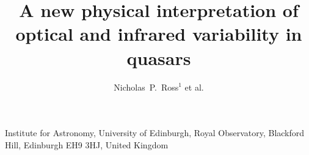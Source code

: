 \documentclass{nature}
\title{A new physical interpretation of optical and infrared variability in quasars}
\author{Nicholas~P.~Ross$^{1}$ et al.  
}
\begin{document}
\maketitle

\begin{affiliations}
  \item Institute for Astronomy, University of Edinburgh, Royal Observatory, Blackford Hill, Edinburgh EH9 3HJ, United Kingdom 
\end{affiliations}
\end{document}
